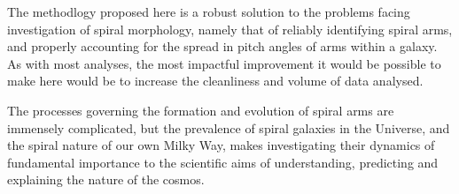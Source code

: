The methodlogy proposed here is a robust solution to the problems facing investigation of spiral morphology, namely that of reliably identifying spiral arms, and properly accounting for the spread in pitch angles of arms within a galaxy. As with most analyses, the most impactful improvement it would be possible to make here would be to increase the cleanliness and volume of data analysed.

The processes governing the formation and evolution of spiral arms are immensely complicated, but the prevalence of spiral galaxies in the Universe, and the spiral nature of our own Milky Way, makes investigating their dynamics of fundamental importance to the scientific aims of understanding, predicting and explaining the nature of the cosmos.
